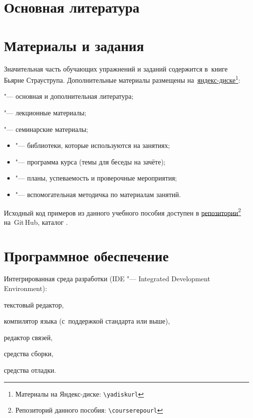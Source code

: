 \section{Основная литература}
\cite{Stroustrup:2016:ru}

\nocite{Kernighan:2004:ru, Meyers:2006:ru, Meyers:2000:ru, Meyers:2002:ru, Meyers:2016:ru, Josuttis:2014:ru, Stroustrup:2006:ru, Stroustrup:2013:en}




\section{Материалы и задания}
Значительная часть обучающих упражнений и заданий содержится в~книге Бьярне Страуструпа. Дополнительные материалы размещены на~\href{\yadiskurl}{яндекс-диске\footnote{Материалы на Яндекс-диске: \nolinkurl{\yadiskurl}}}:
\begin{itemfeature}
  \item {} "--- основная и дополнительная литература;
  \item {} "--- лекционные материалы;
  \item {} "--- семинарские материалы;
  \begin{itemize}
  	\item {} "--- библиотеки, которые используются на занятиях;
  	\item {} "--- программа курса (темы для беседы на зачёте);
  	\item {} "--- планы, успеваемость и проверочные мероприятия;
  	\item {} "--- вспомогательная методичка по материалам занятий.
  \end{itemize}
\end{itemfeature}

Исходный код примеров из данного учебного пособия доступен в \href{\courserepourl}{репозитории}\footnote{Репозиторий данного пособия: \nolinkurl{\courserepourl}} на~Git\,Hub, каталог .



\section{Программное обеспечение}
Интегрированная среда разработки (IDE "--- \textenglish{Integrated Development Environment}):
\begin{itemfeature}
  \item текстовый редактор,
  \item компилятор языка  (с~поддержкой стандарта  или выше),
  \item редактор связей,
  \item средства сборки,
  \item средства отладки.
\end{itemfeature}



